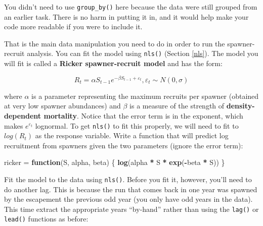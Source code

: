 \documentclass[]{book}
\newenvironment{Shaded}{\begin{snugshade}}{\end{snugshade}}
\newcommand{\KeywordTok}[1]{\textcolor[rgb]{0.13,0.29,0.53}{\textbf{#1}}}
\newcommand{\DecValTok}[1]{\textcolor[rgb]{0.00,0.00,0.81}{#1}}
\newcommand{\StringTok}[1]{\textcolor[rgb]{0.31,0.60,0.02}{#1}}
\newcommand{\CommentTok}[1]{\textcolor[rgb]{0.56,0.35,0.01}{\textit{#1}}}
\newcommand{\ControlFlowTok}[1]{\textcolor[rgb]{0.13,0.29,0.53}{\textbf{#1}}}
\newcommand{\OperatorTok}[1]{\textcolor[rgb]{0.81,0.36,0.00}{\textbf{#1}}}
\newcommand{\NormalTok}[1]{#1}
\theoremstyle{definition}
\theoremstyle{definition}
\theoremstyle{definition}
\theoremstyle{remark}
\begin{document}
You didn't need to use \texttt{group\_by()} here because the data were
still grouped from an earlier task. There is no harm in putting it in,
and it would help make your code more readable if you were to include
it.

That is the main data manipulation you need to do in order to run the
spawner-recruit analysis. You can fit the model using \texttt{nls()}
(Section \ref{nls}). The model you will fit is called a \textbf{Ricker
spawner-recruit model} and has the form:

\begin{equation}
  R_t = \alpha S_{t-1} e^{-\beta S_{t-1} + \varepsilon_t} ,\varepsilon_t \sim N(0,\sigma)
\label{eq:ricker-ch5}
\end{equation}

where \(\alpha\) is a parameter representing the maximum recruits per
spawner (obtained at very low spawner abundances) and \(\beta\) is a
measure of the strength of \textbf{density-dependent mortality}. Notice
that the error term is in the exponent, which makes
\(e^{\varepsilon_t}\) lognormal. To get \texttt{nls()} to fit this
properly, we will need to fit to \(log(R_t)\) as the response variable.
Write a function that will predict log recruitment from spawners given
the two parameters (ignore the error term):

\begin{Shaded}
\begin{Highlighting}[]
\NormalTok{ricker =}\StringTok{ }\ControlFlowTok{function}\NormalTok{(S, alpha, beta) \{}
  \KeywordTok{log}\NormalTok{(alpha }\OperatorTok{*}\StringTok{ }\NormalTok{S }\OperatorTok{*}\StringTok{ }\KeywordTok{exp}\NormalTok{(}\OperatorTok{-}\NormalTok{beta }\OperatorTok{*}\StringTok{ }\NormalTok{S))}
\NormalTok{\}}
\end{Highlighting}
\end{Shaded}

Fit the model to the data using \texttt{nls()}. Before you fit it,
however, you'll need to do another lag. This is because the run that
comes back in one year was spawned by the escapement the previous odd
year (you only have odd years in the data). This time extract the
appropriate years ``by-hand'' rather than using the \texttt{lag()} or
\texttt{lead()} functions as before:

\begin{Shaded}
\end{Shaded}
\end{document}
